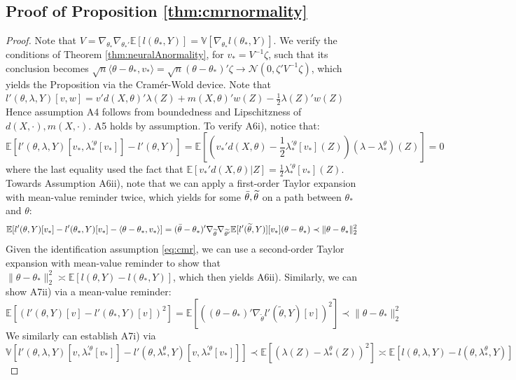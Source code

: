 \documentclass[12pt]{article}
\theoremstyle{myplain}
\theoremstyle{definition}
\theoremstyle{definition}
\theoremstyle{remark}
\numberwithin{equation}{section}
\begin{document}
\subsection{Proof of Proposition \ref{thm:cmrnormality}}
\begin{proof}
Note that $V=\nabla_{\theta_*}\nabla_{\theta_*'}\mathbb{E}[l(\theta_*, Y)]=\mathbb{V}[\nabla_{\theta_*}l(\theta_*, Y)]$. We verify the conditions of Theorem \ref{thm:neuralAnormality}, for $v_*=V^{-1}\zeta$, such that its conclusion becomes $\sqrt{n}\langle \theta-\theta_*, v_*\rangle=\sqrt{n}(\theta-\theta_*)'\zeta\to\mathcal{N}(0,\zeta'V^{-1}\zeta)$, which yields the Proposition via the Cramér-Wold device. Note that $l'(\theta,\lambda,Y)[v,w]=v'd(X,\theta)'\lambda(Z)+m(X,\theta)'w(Z)-\frac{1}{2}\lambda(Z)'w(Z)$ 
Hence assumption A4 follows from boundedness and Lipschitzness of $d(X,\cdot), m(X,\cdot)$. A5 holds by assumption. To verify A6i), notice that:
$$\mathbb{E}[l'(\theta,\lambda,Y)[v_*, \lambda_*^{\prime\theta}[v_*]]-l'(\theta,Y)]  = \mathbb{E}\left[\left(v_*'d(X,\theta)-\frac{1}{2}\lambda_*^{\prime\theta}[v_*](Z)\right)\left(\lambda-\lambda_*^\theta\right)(Z)\right]=0$$
where the last equality used the fact that $\mathbb{E}[v_*'d(X,\theta)|Z]=\frac{1}{2}\lambda_*^{\prime\theta}[v_*](Z)$.
Towards Assumption A6ii), note that we can apply a first-order Taylor expansion with mean-value reminder twice, which yields for some $\Bar{\theta}, \widetilde{\theta}$ on a path between $\theta_*$ and $\theta$: $$\mathbb{E}[l'(\theta, Y)[v_*]-l'(\theta_*, Y)[v_*]-\langle \theta-\theta_*, v_*\rangle]=(\Bar{\theta}-\theta_*)'\nabla_{\widetilde{\theta}}\nabla_{\widetilde{\theta'}}\mathbb{E}[l'(\widetilde{\theta}, Y)][v_*](\theta-\theta_*)\prec \|\theta-\theta_*\|_2^2$$
Given the identification assumption \ref{eq:cmr}, we can use a second-order Taylor expansion with mean-value reminder to show that $\|\theta-\theta_*\|_2^2 \asymp \mathbb{E}[l(\theta, Y)-l(\theta_*, Y)]$, which then yields A6ii). Similarly, we can show A7ii) via a mean-value reminder: 
$$\mathbb{E}[(l'(\theta, Y)[v]-l'(\theta_*, Y)[v])^2]=\mathbb{E}\left[\left((\theta-\theta_*)'\nabla_{\widetilde{\theta}}l'(\widetilde{\theta}, Y)[v]\right)^2\right]\prec\|\theta-\theta_*\|_2^2$$
We similarly can establish A7i) via 
\begin{equation*}
\mathbb{V}[l'(\theta, \lambda, Y)[v,\lambda_*^{\prime\theta}[v_*]]-l'(\theta, \lambda_*^\theta, Y)[v,\lambda_*^{\prime\theta}[v_*]]]\prec \mathbb{E}[(\lambda(Z)-\lambda_*^\theta(Z))^2]\asymp\mathbb{E}[l(\theta,\lambda,Y)-l(\theta,\lambda_*^\theta, Y)]
\end{equation*}
\end{proof}
\end{document}

